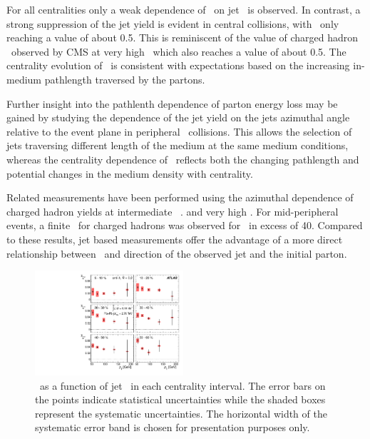 For all centralities only a weak dependence of \Rcp\ on jet \pT\ is observed.
In contrast, a strong suppression of the jet yield is evident in
central collisions, with \Rcp\ only reaching a value of about 0.5.
This is reminiscent of the value of charged hadron \Raa\ observed
by CMS at very high \pT\, which also reaches a value of about 0.5.
The centrality evolution of \Rcp\ is consistent with expectations
based on the increasing in-medium pathlength traversed by the partons.

Further insight into the pathlenth dependence of parton energy
loss may be gained by studying the dependence of the jet yield
on the jets azimuthal angle relative to the event plane
in peripheral \PbPb\ collisions. This allows the selection of jets
traversing different length of the medium at the same medium
conditions, whereas the centrality dependence of \Rcp\ reflects
both the changing pathlength and potential changes in the medium
density with centrality.

Related measurements have been performed using the azimuthal dependence
of charged hadron yields at intermediate \pT\
\cite{Adams:2004wz,Adler:2006bw,Adare:2010sp, ATLAS:2011ah, Abelev:2012di}.
and very high \pT \cite{Chatrchyan:2012xq}. For mid-peripheral events,
a finite \vtwo\ for charged hadrons was observed for \pT\ in excess of 40\GeVc.
Compared to these results, jet based measurements offer the advantage
of a more direct relationship between \pT\ and direction of the observed
jet and the initial parton.

\begin{figure}[!th]
\begin{center}
\includegraphics[width=0.49\textwidth]{jetfigures/ATLAS_jetv2.pdf}
\caption{\vtjet\ as a function of jet \pT\ in each centrality
   interval. The error bars on the points indicate statistical
   uncertainties while the shaded boxes represent the systematic
   uncertainties. The horizontal width of the systematic
   error band is chosen for presentation purposes only. }
\label{fig:GR:ATLAS_jet_v2}
\end{center}
\end{figure}

